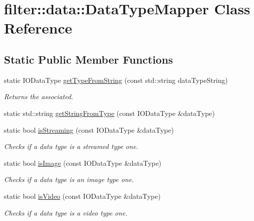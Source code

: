 \hypertarget{classfilter_1_1data_1_1_data_type_mapper}{}\section{filter\+:\+:data\+:\+:Data\+Type\+Mapper Class Reference}
\label{classfilter_1_1data_1_1_data_type_mapper}
\subsection*{Static Public Member Functions}
\begin{DoxyCompactItemize}
\item 
static I\+O\+Data\+Type \hyperlink{classfilter_1_1data_1_1_data_type_mapper_afb0b4b71313e5ac7e681a8dc01518e8f}{get\+Type\+From\+String} (const std\+::string data\+Type\+String)
\begin{DoxyCompactList}\small\item\em Returns the associated. \end{DoxyCompactList}\item 
static std\+::string \hyperlink{classfilter_1_1data_1_1_data_type_mapper_a96e71517bc63d051a539162c26d17fc9}{get\+String\+From\+Type} (const I\+O\+Data\+Type \&data\+Type)
\item 
static bool \hyperlink{classfilter_1_1data_1_1_data_type_mapper_a5c2902ea638cf883f1955bfa1bebfc5e}{is\+Streaming} (const I\+O\+Data\+Type \&data\+Type)
\begin{DoxyCompactList}\small\item\em Checks if a data type is a streamed type one. \end{DoxyCompactList}\item 
static bool \hyperlink{classfilter_1_1data_1_1_data_type_mapper_acd18a509528e02426321f1d979be148c}{is\+Image} (const I\+O\+Data\+Type \&data\+Type)
\begin{DoxyCompactList}\small\item\em Checks if a data type is an image type one. \end{DoxyCompactList}\item 
static bool \hyperlink{classfilter_1_1data_1_1_data_type_mapper_ae21733c90e100f82c69455bc3ae1f2e2}{is\+Video} (const I\+O\+Data\+Type \&data\+Type)
\begin{DoxyCompactList}\small\item\em Checks if a data type is a video type one. \end{DoxyCompactList}\item 

\end{DoxyCompactItemize}
